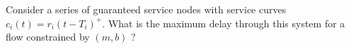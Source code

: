 \begin{problem}

Consider a series of guaranteed service nodes with service curves
$c_{i}(t) = r_{i}(t-T_{i})^{+}$. What is the maximum delay through
this system for a flow constrained by $(m,b)$ ? 
\end{problem}
